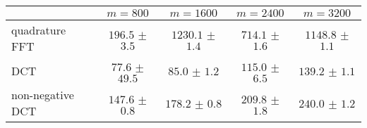 \centering
\renewcommand{\arraystretch}{1.2}
\begin{tabular}{@{}lcccc@{}}
\toprule
 & $m=800$ & $m=1600$ & $m=2400$ & $m=3200$\\
\midrule
quadrature FFT & $196.5$ $\pm$ $3.5$ & $1230.1$ $\pm$ $1.4$ & $714.1$ $\pm$ $1.6$ & $1148.8$ $\pm$ $1.1$ \\
DCT & $77.6$ $\pm$ $49.5$ & $85.0$ $\pm$ $1.2$ & $115.0$ $\pm$ $6.5$ & $139.2$ $\pm$ $1.1$ \\
non-negative DCT & $147.6$ $\pm$ $0.8$ & $178.2$ $\pm$ $0.8$ & $209.8$ $\pm$ $1.8$ & $240.0$ $\pm$ $1.2$ \\
\bottomrule
\end{tabular}
